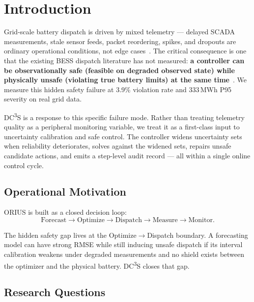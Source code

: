 \documentclass[11pt,a4paper]{article}
\begin{document}
\section{Introduction}\label{sec:intro}

Grid-scale battery dispatch is driven by mixed telemetry --- delayed SCADA measurements, stale sensor feeds, packet reordering, spikes, and dropouts are ordinary operational conditions, not edge cases~\cite{dibaji2019systems,chandola2009anomaly}. The critical consequence is one that the existing BESS dispatch literature has not measured: \textbf{a controller can be observationally safe (feasible on degraded observed state) while physically unsafe (violating true battery limits) at the same time}~\cite{chen2020review_bess}. We measure this hidden safety failure at 3.9\% violation rate and 333\,MWh P95 severity on real grid data.

DC\textsuperscript{3}S is a response to this specific failure mode. Rather than treating telemetry quality as a peripheral monitoring variable, we treat it as a first-class input to uncertainty calibration and safe control. The controller widens uncertainty sets when reliability deteriorates, solves against the widened sets, repairs unsafe candidate actions, and emits a step-level audit record --- all within a single online control cycle.

\subsection{Operational Motivation}

ORIUS is built as a closed decision loop:
\[
\text{Forecast} \rightarrow \text{Optimize} \rightarrow \text{Dispatch} \rightarrow \text{Measure} \rightarrow \text{Monitor}.
\]

The hidden safety gap lives at the Optimize$\to$Dispatch boundary. A forecasting model can have strong RMSE while still inducing unsafe dispatch if its interval calibration weakens under degraded measurements and no shield exists between the optimizer and the physical battery. DC\textsuperscript{3}S closes that gap.

\subsection{Research Questions}
\end{document}
